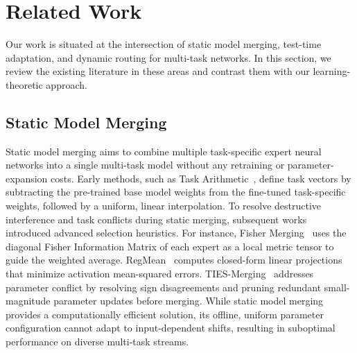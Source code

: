 \section{Related Work}
\label{submission:related_work}

Our work is situated at the intersection of static model merging, test-time adaptation, and dynamic routing for multi-task networks. In this section, we review the existing literature in these areas and contrast them with our learning-theoretic approach.

\subsection{Static Model Merging}
Static model merging aims to combine multiple task-specific expert neural networks into a single multi-task model without any retraining or parameter-expansion costs. 
Early methods, such as Task Arithmetic~\cite{ilharco2022taskvectors}, define task vectors by subtracting the pre-trained base model weights from the fine-tuned task-specific weights, followed by a uniform, linear interpolation. 
To resolve destructive interference and task conflicts during static merging, subsequent works introduced advanced selection heuristics. 
For instance, Fisher Merging~\cite{fishermerging} uses the diagonal Fisher Information Matrix of each expert as a local metric tensor to guide the weighted average. 
RegMean~\cite{regmean} computes closed-form linear projections that minimize activation mean-squared errors. 
TIES-Merging~\cite{yadav2023ties} addresses parameter conflict by resolving sign disagreements and pruning redundant small-magnitude parameter updates before merging. 
While static model merging provides a computationally efficient solution, its offline, uniform parameter configuration cannot adapt to input-dependent shifts, resulting in suboptimal performance on diverse multi-task streams.

